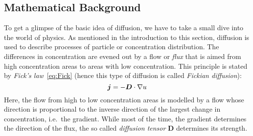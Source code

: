 \subsection{Mathematical Background}
To get a glimpse of the basic idea of diffusion, we have to take a small dive into the world of
physics.
As mentioned in the introduction to this section, diffusion is used to describe processes of
particle or concentration distribution. The differences in concentration are evened out by a flow
or \textit{flux} that is aimed from high concentration areas to areas with low concentration. This
principle is stated by \textit{Fick's law}~\eqref{eq:Fick} (hence this type of diffusion is called \textit{Fickian
diffusion}):
\begin{equation}
    \boldsymbol j = -\boldsymbol D\cdot\mathbf{\nabla} u\label{eq:Fick}
\end{equation}
Here, the flow from high to low concentration areas is modelled by a flow whose direction is
proportional to the inverse direction of the largest change in concentration, i.e.\ the gradient.
While most of the time, the gradient determines the direction of the flux, the so called
\textit{diffusion tensor} $\boldsymbol D$ determines its strength. \\

